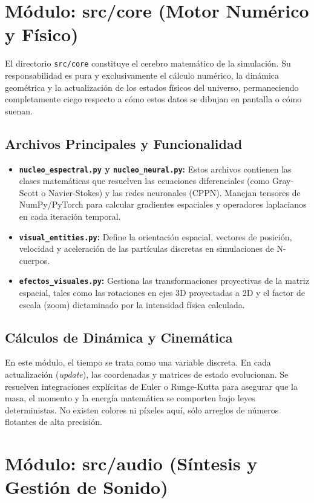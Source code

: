 \documentclass[12pt, openany]{book}
\begin{document}
\section{Módulo: src/core (Motor Numérico y Físico)}

El directorio \texttt{src/core} constituye el cerebro matemático de la simulación. Su responsabilidad es pura y exclusivamente el cálculo numérico, la dinámica geométrica y la actualización de los estados físicos del universo, permaneciendo completamente ciego respecto a cómo estos datos se dibujan en pantalla o cómo suenan.

\subsection{Archivos Principales y Funcionalidad}
\begin{itemize}
    \item \textbf{\texttt{nucleo\_espectral.py} y \textbf{\texttt{nucleo\_neural.py}}:} Estos archivos contienen las clases matemáticas que resuelven las ecuaciones diferenciales (como Gray-Scott o Navier-Stokes) y las redes neuronales (CPPN). Manejan tensores de NumPy/PyTorch para calcular gradientes espaciales y operadores laplacianos en cada iteración temporal.
    \item \textbf{\texttt{visual\_entities.py}:} Define la orientación espacial, vectores de posición, velocidad y aceleración de las partículas discretas en simulaciones de N-cuerpos. 
    \item \textbf{\texttt{efectos\_visuales.py}:} Gestiona las transformaciones proyectivas de la matriz espacial, tales como las rotaciones en ejes 3D proyectadas a 2D y el factor de escala (zoom) dictaminado por la intensidad física calculada.
\end{itemize}

\subsection{Cálculos de Dinámica y Cinemática}
En este módulo, el tiempo se trata como una variable discreta. En cada actualización (\textit{update}), las coordenadas y matrices de estado evolucionan. Se resuelven integraciones explícitas de Euler o Runge-Kutta para asegurar que la masa, el momento y la energía matemática se comporten bajo leyes deterministas. No existen colores ni píxeles aquí, sólo arreglos de números flotantes de alta precisión.

\section{Módulo: src/audio (Síntesis y Gestión de Sonido)}
\end{document}
